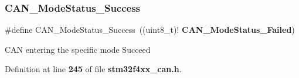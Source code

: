 \subsubsection{C\+A\+N\+\_\+\+Mode\+Status\+\_\+\+Success}
{\footnotesize\ttfamily \#define C\+A\+N\+\_\+\+Mode\+Status\+\_\+\+Success~((uint8\+\_\+t)!\textbf{ C\+A\+N\+\_\+\+Mode\+Status\+\_\+\+Failed})}

C\+AN entering the specific mode Succeed 

Definition at line \textbf{ 245} of file \textbf{ stm32f4xx\+\_\+can.\+h}.

